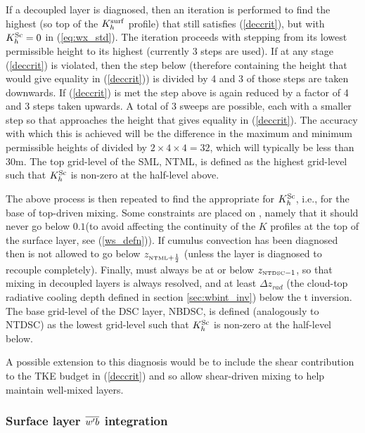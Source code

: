 \documentclass{UMDP_article}
\begin{document}
If a decoupled layer is diagnosed, then an iteration is performed to
find the highest \zh (so top of the $K_h^{\rm surf}$ profile) that still
satisfies (\ref{deccrit}), but with $K_h^{\rm Sc}=0$ in (\ref{eq:wx_std}).
The iteration proceeds with \zh stepping from its lowest permissible
height to its highest (currently 3 steps are used).  If at any stage
(\ref{deccrit}) is violated, then the step below (therefore containing
the height that would give equality in (\ref{deccrit})) is divided by
4 and 3 of those steps are taken downwards.  If (\ref{deccrit}) is met
the step above is again reduced by a factor of 4 and 3 steps taken
upwards.  A total of 3 sweeps are possible, each with a smaller step
so that \zh approaches the height that gives equality in
(\ref{deccrit}).  The accuracy with which this is achieved will be the
difference in the maximum and minimum permissible heights of \zh
divided by $2\times4\times4 = 32$, which will typically be less than
30m.  The top grid-level of the SML, NTML, is defined as the highest
grid-level such that $K_h^{\rm Sc}$ is non-zero at the half-level above.

The above process is then repeated to find the appropriate \zbase for
$K_h^{\rm Sc}$, \mbox{i.e.}, for the base of top-driven mixing.  Some
constraints are placed on \zbase, namely that it should never go below
$0.1$\zh (to avoid affecting the continuity of the $K$ profiles at the
top of the surface layer, see (\ref{ws_defn})). If cumulus convection
has been diagnosed then \zbase is not allowed to go below
$z_{\mbox{\tiny \rm NTML}+\frac{1}{2}}$ (unless the layer is diagnosed to recouple
completely).  Finally, \zbase must always be at or below
$z_{\mbox{\tiny \rm NTDSC}-1}$, so that mixing in decoupled layers is always resolved,
and at least $\Delta z_{rad}$ (the cloud-top radiative cooling depth
defined in section \ref{sec:wbint_inv}) below the t inversion.  The
base grid-level of the DSC layer, NBDSC, is defined (analogously to
NTDSC) as the lowest grid-level such that $K_h^{\rm Sc}$ is non-zero at the
half-level below.

A possible extension to this diagnosis would be to include the shear
contribution to the TKE budget in (\ref{deccrit}) and so allow
shear-driven mixing to help maintain well-mixed layers.

\subsubsection{Surface layer $\overline{w'b}$ integration}
\end{document}
